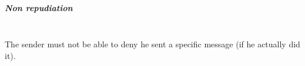 \subparagraph{\textit{Non repudiation}} \hspace{0pt} \\
\small{The sender must not be able to deny he sent a specific message (if he actually did it).}
\vspace{25pt}
\newline